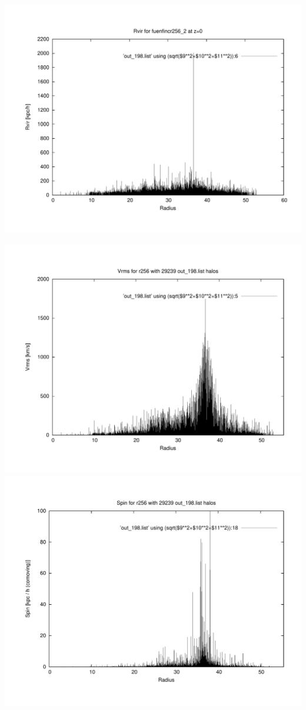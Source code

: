\includegraphics[scale=0.3]{r256/h100/fuenfincr256_2/plot_rvir_z0.pdf}

\includegraphics[scale=0.3]{r256/h100/fuenfincr256_2/plot_Vrms_out_198.pdf}
\includegraphics[scale=0.3]{r256/h100/fuenfincr256_2/plot_spin_out_198.pdf}

